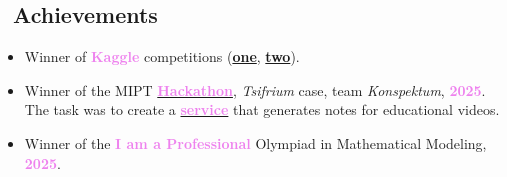 \documentclass[a4paper,12pt]{article}
\begin{document}
	\subsection*{\faTrophy\ Achievements}
	\begin{itemize}
		\item Winner of \textcolor{violet}{\textbf{Kaggle}} competitions (\href{https://www.kaggle.com/competitions/fall-ml-4-mipt-2025/leaderboard}{\textbf{one}}, \href{https://www.kaggle.com/competitions/fall-ml-6-mipt-2025/leaderboard}{\textbf{two}}).
		\item Winner of the MIPT \href{https://www.figma.com/board/JqewkyeKxGNv3K8oA2SAdw}{\textcolor{violet}{\textbf{Hackathon}}}, \textit{Tsifrium} case, team \textit{Konspektum}, \textcolor{violet}{\textbf{2025}}. \\
		The task was to create a \href{https://github.com/petrovortex/konspektum}{\textcolor{violet}{\textbf{service}}} that generates notes for educational videos.
		
		\item Winner of the \textcolor{violet}{\textbf{I am a Professional}} Olympiad in Mathematical Modeling, \textcolor{violet}{\textbf{2025}}.
	\end{itemize}
	
	\newpage
	
\end{document}
